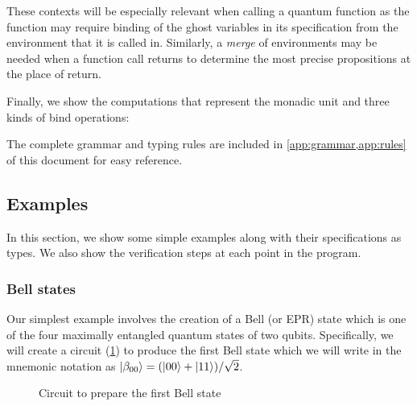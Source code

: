 \documentclass[adraft,creativecommons]{eptcs}
\theoremstyle{definition}
\theoremstyle{remark}
\begin{document}

These contexts will be especially relevant when calling a quantum function as the function may require binding of the ghost variables in its specification from the environment that it is called in. Similarly, a \textit{merge} of environments may be needed when a function call returns to determine the most precise propositions at the place of return.

Finally, we show the computations that represent the monadic unit and three kinds of bind operations:


The complete grammar and typing rules are included in \cref{app:grammar,app:rules} of this document for easy reference.

\subsection{Examples}

In this section, we show some simple examples along with their specifications as types. We also show the verification steps at each point in the program.

\subsubsection{Bell states}

Our simplest example involves the creation of a Bell (or EPR) state which is one of the four maximally entangled quantum states of two qubits. Specifically, we will create a circuit (\cref{fig:bell00}) to produce the first Bell state which we will write in the mnemonic notation as $\ket{\beta_{00}} = (\ket{00}+\ket{11})/\sqrt{2}$.

\begin{figure}[t]
    \centering
    \caption{Circuit to prepare the first Bell state}
    \label{fig:bell00}
\end{figure}


\end{document}
